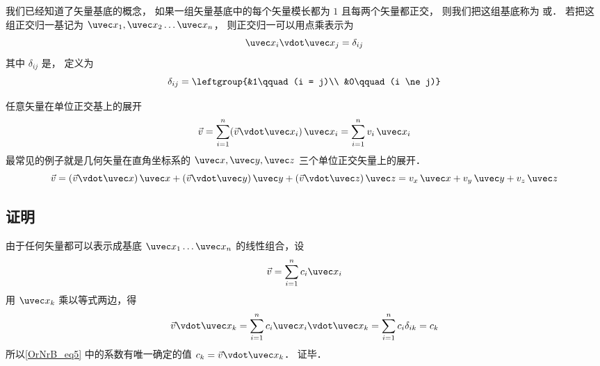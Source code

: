 

我们已经知道了矢量基底的概念， 如果一组矢量基底中的每个矢量模长都为 $1$ 且每两个矢量都正交， 则我们把这组基底称为 或． 若把这组正交归一基记为 $\uvec x_1,\uvec x_2\dots\uvec x_n$， 则正交归一可以用点乘表示为
\begin{equation}
\uvec x_i \vdot \uvec x_j = \delta _{ij}
\end{equation}
其中 $\delta_{ij}$ 是， 定义为
\begin{equation}\label{OrNrB_eq2}
\delta_{ij} = \leftgroup{&1\qquad (i = j)\\ &0\qquad (i \ne j)}
\end{equation}

任意矢量在单位正交基上的展开
 \begin{equation}
\vec v = \sum_{i = 1}^n (\vec v\vdot\uvec x_i)\,\uvec x_i = \sum_{i = 1}^n v_i \,\uvec x_i
\end{equation}
最常见的例子就是几何矢量在直角坐标系的 $\uvec x, \uvec y, \uvec z$ 三个单位正交矢量上的展开．
 \begin{equation}
\vec v = (\vec v \vdot \uvec x)\,\uvec x + (\vec v \vdot \uvec y)\,\uvec y + (\vec v \vdot \uvec z)\,\uvec z = v_x \,\uvec x + v_y \,\uvec y + v_z \,\uvec z
\end{equation} 

\subsection{证明}
由于任何矢量都可以表示成基底 $\uvec x_1 \dots \uvec x_n$ 的线性组合，设
\begin{equation}\label{OrNrB_eq5}
\vec v = \sum_{i = 1}^n c_i \uvec x_i
\end{equation} 
用 $\uvec x_k$ 乘以等式两边，得
\begin{equation}
\vec v \vdot \uvec x_k = \sum_{i = 1}^n  c_i \uvec x_i \vdot\uvec x_k = \sum_{i = 1}^n c_i \delta_{ik}  = c_k
\end{equation}
所以\autoref{OrNrB_eq5} 中的系数有唯一确定的值 $c_k = \vec v \vdot\uvec x_k$． 证毕．







